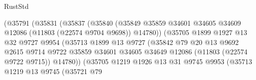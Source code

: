 \begin{lexlean}{RustStd}
\begin{coremodule}
                                  (@35791
                                    (@35831
                                      (@35837
                                        (@35840
                                          (@35849
                                            @35859
                                            @34601
                                            @34605
                                            @34609
                                            @12086
                                            (@11803 (@22574 @9704 @9698))
                                            @14780))
                                        (@35705
                                          @1899
                                          @1927
                                          @13
                                          @32
                                          @9727
                                          @9954
                                          (@35713
                                            @1899
                                            @13
                                            @9727
                                            (@35842
                                              @79
                                              @20
                                              @13
                                              @9692
                                              @2615
                                              @9714
                                              @9722
                                              @35859
                                              @34601
                                              @34605
                                              @34649
                                              @12086
                                              (@11803 (@22574 @9722 @9715))
                                              @14780))
                                          (@35705
                                            @1219
                                            @1926
                                            @13
                                            @31
                                            @9745
                                            @9953
                                            (@35713
                                              @1219
                                              @13
                                              @9745
                                              (@35721
                                                @79

\end{coremodule}
\end{lexlean}
